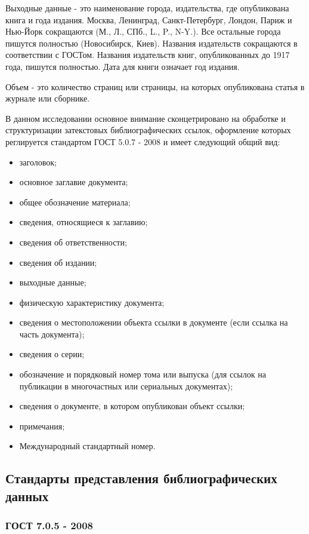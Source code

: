 Выходные данные - это наименование города, издательства, где опубликована книга и года издания. Москва, Ленинград, Санкт-Петербург, Лондон, Париж и Нью-Йорк сокращаются (М., Л., СПб., L., P., N-Y.). Все остальные города пишутся полностью (Новосибирск, Киев). Названия издательств сокращаются в соответствии с ГОСТом. Названия издательств книг, опубликованных до 1917 года, пишутся полностью. Дата для книги означает год издания.

Объем - это количество страниц или страницы, на которых опубликована статья в журнале или сборнике.

В данном исследовании основное внимание сконцетрировано на обработке и структуризации затекстовых библиографических ссылок, оформление которых реглируется стандартом ГОСТ 5.0.7 - 2008 и имеет следующий общий вид:
\begin{itemize}
	\item заголовок;
	\item основное заглавие документа;
	\item общее обозначение материала;
	\item сведения, относящиеся к заглавию;
	\item сведения об ответственности;
	\item сведения об издании;
	\item выходные данные;
	\item физическую характеристику документа;
	\item сведения о местоположении объекта ссылки в документе (если ссылка на часть документа);
	\item сведения о серии;
	\item обозначение и порядковый номер тома или выпуска (для ссылок на публикации в многочастных или сериальных документах);
	\item сведения о документе, в котором опубликован объект ссылки;
	\item примечания;
	\item Международный стандартный номер.
\end{itemize}

\subsection{Стандарты представления библиографических данных}


\subsubsection{ГОСТ 7.0.5 - 2008}


